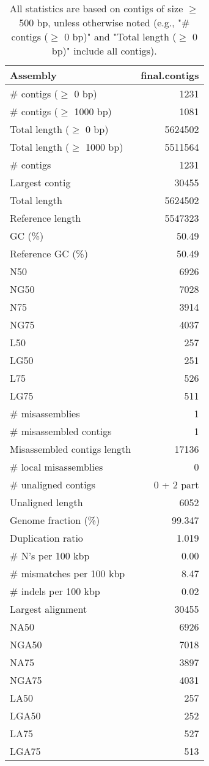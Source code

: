 \documentclass[12pt,a4paper]{article}
\begin{document}
\begin{table}[ht]
\begin{center}
\caption{All statistics are based on contigs of size $\geq$ 500 bp, unless otherwise noted (e.g., "\# contigs ($\geq$ 0 bp)" and "Total length ($\geq$ 0 bp)" include all contigs).}
\begin{tabular}{|l*{1}{|r}|}
\hline
Assembly & final.contigs \\ \hline
\# contigs ($\geq$ 0 bp) & 1231 \\ \hline
\# contigs ($\geq$ 1000 bp) & 1081 \\ \hline
Total length ($\geq$ 0 bp) & 5624502 \\ \hline
Total length ($\geq$ 1000 bp) & 5511564 \\ \hline
\# contigs & 1231 \\ \hline
Largest contig & 30455 \\ \hline
Total length & 5624502 \\ \hline
Reference length & 5547323 \\ \hline
GC (\%) & 50.49 \\ \hline
Reference GC (\%) & 50.49 \\ \hline
N50 & 6926 \\ \hline
NG50 & 7028 \\ \hline
N75 & 3914 \\ \hline
NG75 & 4037 \\ \hline
L50 & 257 \\ \hline
LG50 & 251 \\ \hline
L75 & 526 \\ \hline
LG75 & 511 \\ \hline
\# misassemblies & 1 \\ \hline
\# misassembled contigs & 1 \\ \hline
Misassembled contigs length & 17136 \\ \hline
\# local misassemblies & 0 \\ \hline
\# unaligned contigs & 0 + 2 part \\ \hline
Unaligned length & 6052 \\ \hline
Genome fraction (\%) & 99.347 \\ \hline
Duplication ratio & 1.019 \\ \hline
\# N's per 100 kbp & 0.00 \\ \hline
\# mismatches per 100 kbp & 8.47 \\ \hline
\# indels per 100 kbp & 0.02 \\ \hline
Largest alignment & 30455 \\ \hline
NA50 & 6926 \\ \hline
NGA50 & 7018 \\ \hline
NA75 & 3897 \\ \hline
NGA75 & 4031 \\ \hline
LA50 & 257 \\ \hline
LGA50 & 252 \\ \hline
LA75 & 527 \\ \hline
LGA75 & 513 \\ \hline
\end{tabular}
\end{center}
\end{table}
\end{document}
